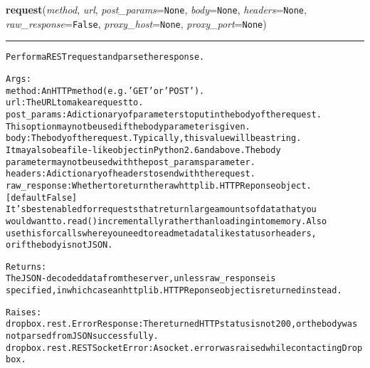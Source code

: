 \hspace{.8\funcindent}\begin{boxedminipage}{\funcwidth}

    \raggedright \textbf{request}(\textit{method}, \textit{url}, \textit{post\_params}={\tt None}, \textit{body}={\tt None}, \textit{headers}={\tt None}, \textit{raw\_response}={\tt False}, \textit{proxy\_host}={\tt None}, \textit{proxy\_port}={\tt None})

    \vspace{-1.5ex}

    \rule{\textwidth}{0.5\fboxrule}
\setlength{\parskip}{2ex}
\begin{alltt}
Perform a REST request and parse the response.

Args:
    method: An HTTP method (e.g. 'GET' or 'POST').
    url: The URL to make a request to.
    post\_params: A dictionary of parameters to put in the body of the request.
        This option may not be used if the body parameter is given.
    body: The body of the request. Typically, this value will be a string.
        It may also be a file-like object in Python 2.6 and above. The body
        parameter may not be used with the post\_params parameter.
    headers: A dictionary of headers to send with the request.
    raw\_response: Whether to return the raw httplib.HTTPReponse object. [default False]
        It's best enabled for requests that return large amounts of data that you
        would want to .read() incrementally rather than loading into memory. Also
        use this for calls where you need to read metadata like status or headers,
        or if the body is not JSON.

Returns:
    The JSON-decoded data from the server, unless raw\_response is
    specified, in which case an httplib.HTTPReponse object is returned instead.

Raises:
    dropbox.rest.ErrorResponse: The returned HTTP status is not 200, or the body was
        not parsed from JSON successfully.
    dropbox.rest.RESTSocketError: A socket.error was raised while contacting Dropbox.
\end{alltt}

\setlength{\parskip}{1ex}
    \end{boxedminipage}

    \label{lib:dropbox:RESTClient:GET}

    \vspace{0.5ex}

